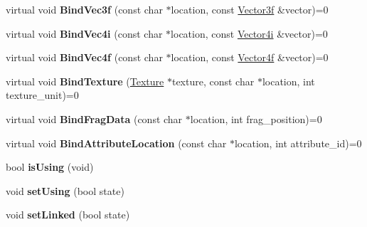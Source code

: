 \begin{DoxyCompactItemize}
\item 
\hypertarget{classEngine_1_1IShader_a14a8cadb90c6fc388151696ac1ebeddc}{}virtual void {\bfseries Bind\+Vec3f} (const char $\ast$location, const \hyperlink{classVector3}{Vector3f} \&vector)=0\label{classEngine_1_1IShader_a14a8cadb90c6fc388151696ac1ebeddc}

\item 
\hypertarget{classEngine_1_1IShader_ae89d7b6e3645ec29de4aca13e5e1f804}{}virtual void {\bfseries Bind\+Vec4i} (const char $\ast$location, const \hyperlink{classVector4}{Vector4i} \&vector)=0\label{classEngine_1_1IShader_ae89d7b6e3645ec29de4aca13e5e1f804}

\item 
\hypertarget{classEngine_1_1IShader_a8ce7543b1ba4bc008656fd74fecdfef2}{}virtual void {\bfseries Bind\+Vec4f} (const char $\ast$location, const \hyperlink{classVector4}{Vector4f} \&vector)=0\label{classEngine_1_1IShader_a8ce7543b1ba4bc008656fd74fecdfef2}

\item 
\hypertarget{classEngine_1_1IShader_a907a1a7a4b8c5c8b77e624a8bee5d478}{}virtual void {\bfseries Bind\+Texture} (\hyperlink{classEngine_1_1Texture}{Texture} $\ast$texture, const char $\ast$location, int texture\+\_\+unit)=0\label{classEngine_1_1IShader_a907a1a7a4b8c5c8b77e624a8bee5d478}

\item 
\hypertarget{classEngine_1_1IShader_a5af3bbe28c3347215fc23b95bb7700d8}{}virtual void {\bfseries Bind\+Frag\+Data} (const char $\ast$location, int frag\+\_\+position)=0\label{classEngine_1_1IShader_a5af3bbe28c3347215fc23b95bb7700d8}

\item 
\hypertarget{classEngine_1_1IShader_a3130202482a59d635328874b3b2b0d27}{}virtual void {\bfseries Bind\+Attribute\+Location} (const char $\ast$location, int attribute\+\_\+id)=0\label{classEngine_1_1IShader_a3130202482a59d635328874b3b2b0d27}

\item 
\hypertarget{classEngine_1_1IShader_a062e75d0707ff374417c3fe93c12168d}{}bool {\bfseries is\+Using} (void)\label{classEngine_1_1IShader_a062e75d0707ff374417c3fe93c12168d}

\item 
\hypertarget{classEngine_1_1IShader_a763243affdfa7f8b2aa90ecb37f40819}{}void {\bfseries set\+Using} (bool state)\label{classEngine_1_1IShader_a763243affdfa7f8b2aa90ecb37f40819}

\item 
\hypertarget{classEngine_1_1IShader_a0cff6b110c3b1d5788da38d006cd1043}{}void {\bfseries set\+Linked} (bool state)\label{classEngine_1_1IShader_a0cff6b110c3b1d5788da38d006cd1043}


\end{DoxyCompactItemize}

